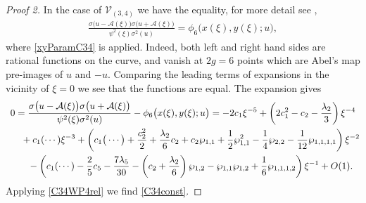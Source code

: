 \documentclass[11pt]{article}
\numberwithin{equation}{section}
\begin{document}
\begin{proof}[Proof 2]
In the case of $\mathcal{V}_{(3,4)}$ we have the equality, for more detail see \cite{BL2005},
\begin{gather}\label{BLRC34}
 \frac{\sigma\big(u-\mathcal{A}(\xi)\big)\sigma\big(u+\mathcal{A}(\xi)\big)} {\psi^2(\xi)\sigma^2(u)} = \phi_{6}\big(x(\xi),y(\xi);u\big),
\end{gather}
where \eqref{xyParamC34} is applied. Indeed, both left and right hand sides are rational functions on the curve, and vanish at $2g=6$ points which are Abel's map pre-images of $u$ and $-u$. Comparing the leading terms of expansions in the vicinity of $\xi=0$ we see that the functions are equal. The expansion gives
\begin{gather*}
 0= \frac{\sigma\big(u-\mathcal{A}(\xi)\big)\sigma\big(u+\mathcal{A}(\xi)\big)}
 {\psi^2(\xi)\sigma^2(u)} - \phi_{6}\big(x(\xi),y(\xi);u\big)= -2 c_1 \xi^{-5}
 + \left(2c_1^2 - c_2 -\frac{\lambda_2}{3}\right)\xi^{-4}
\\ \hphantom{0=}{} + c_1 (\cdots) \xi^{-3}+
 \left(c_1 \big(\cdots \big) + \frac{c_2^2}{2} + \frac{\lambda_2}{6} c_2 + c_2 \wp_{1,1}
 + \frac{1}{2}\wp_{1,1}^2 -\frac{1}{4}\wp_{2,2} -\frac{1}{12}\wp_{1,1,1,1} \right)\xi^{-2}
 \\ \hphantom{0=}{} - \left(c_1 (\cdots ) - \frac{2}{5}c_5
 -\frac{7\lambda_5}{30} - \left(c_2 + \frac{\lambda_2}{6}\right) \wp_{1,2}
 - \wp_{1,1} \wp_{1,2} + \frac{1}{6}\wp_{1,1,1,2}\right)\xi^{-1} + O(1).
\end{gather*}
Applying \eqref{C34WP4rel} we find \eqref{C34const}.
\end{proof}
\end{document}
